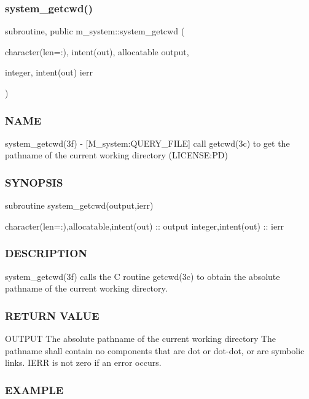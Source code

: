 \subsubsection{\texorpdfstring{system\+\_\+getcwd()}{system\_getcwd()}}
{\footnotesize\ttfamily subroutine, public m\+\_\+system\+::system\+\_\+getcwd (\begin{DoxyParamCaption}\item[{character(len=\+:), intent(out), allocatable}]{output,  }\item[{integer, intent(out)}]{ierr }\end{DoxyParamCaption})}



\subsubsection*{N\+A\+ME}

system\+\_\+getcwd(3f) -\/ \mbox{[}M\+\_\+system\+:Q\+U\+E\+R\+Y\+\_\+\+F\+I\+LE\mbox{]} call getcwd(3c) to get the pathname of the current working directory (L\+I\+C\+E\+N\+SE\+:PD) \subsubsection*{S\+Y\+N\+O\+P\+S\+IS}

subroutine system\+\_\+getcwd(output,ierr)

character(len=\+:),allocatable,intent(out) \+:\+: output integer,intent(out) \+:\+: ierr \subsubsection*{D\+E\+S\+C\+R\+I\+P\+T\+I\+ON}

system\+\_\+getcwd(3f) calls the C routine getcwd(3c) to obtain the absolute pathname of the current working directory.

\subsubsection*{R\+E\+T\+U\+RN V\+A\+L\+UE}

O\+U\+T\+P\+UT The absolute pathname of the current working directory The pathname shall contain no components that are dot or dot-\/dot, or are symbolic links. I\+E\+RR is not zero if an error occurs.

\subsubsection*{E\+X\+A\+M\+P\+LE}


